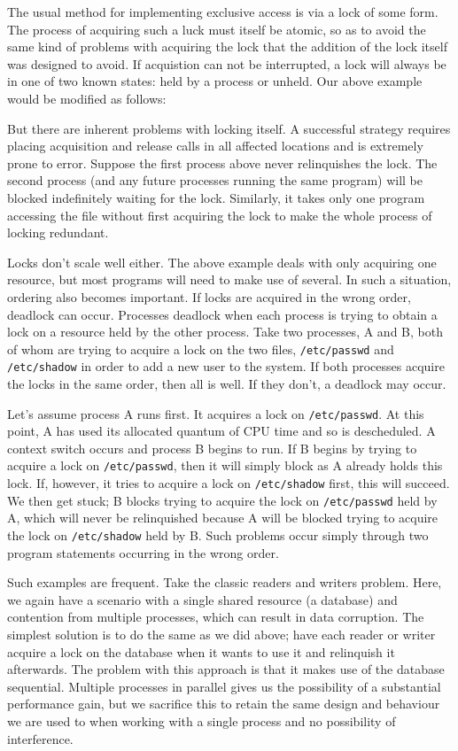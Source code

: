 The usual method for implementing exclusive access is via a lock of
some form.  The process of acquiring such a luck must itself be
atomic, so as to avoid the same kind of problems with acquiring the
lock that the addition of the lock itself was designed to avoid.  If
acquistion can not be interrupted, a lock will always be in one of two
known states: held by a process or unheld.  Our above example would be
modified as follows:


But there are inherent problems with locking itself.  A successful
strategy requires placing acquisition and release calls in all
affected locations and is extremely prone to error.  Suppose the first
process above never relinquishes the lock.  The second process (and
any future processes running the same program) will be blocked
indefinitely waiting for the lock.  Similarly, it takes only one
program accessing the file without first acquiring the lock to make
the whole process of locking redundant.

Locks don't scale well either.  The above example deals with only
acquiring one resource, but most programs will need to make use of
several.  In such a situation, ordering also becomes important.  If
locks are acquired in the wrong order, deadlock can occur.  Processes
deadlock when each process is trying to obtain a lock on a resource
held by the other process.  Take two processes, A and B, both of whom
are trying to acquire a lock on the two files, \texttt{/etc/passwd}
and \texttt{/etc/shadow} in order to add a new user to the system.  If
both processes acquire the locks in the same order, then all is well.
If they don't, a deadlock may occur.

Let's assume process A runs first.  It acquires a lock on
\texttt{/etc/passwd}.  At this point, A has used its allocated quantum
of CPU time and so is descheduled.  A context switch occurs and
process B begins to run.  If B begins by trying to acquire a lock on
\texttt{/etc/passwd}, then it will simply block as A already holds
this lock.  If, however, it tries to acquire a lock on
\texttt{/etc/shadow} first, this will succeed.  We then get stuck; B
blocks trying to acquire the lock on \texttt{/etc/passwd} held by A,
which will never be relinquished because A will be blocked trying to
acquire the lock on \texttt{/etc/shadow} held by B.  Such problems
occur simply through two program statements occurring in the wrong
order.

Such examples are frequent.  Take the classic readers and writers
problem.  Here, we again have a scenario with a single shared resource
(a database) and contention from multiple processes, which can result
in data corruption.  The simplest solution is to do the same as we did
above; have each reader or writer acquire a lock on the database when
it wants to use it and relinquish it afterwards.  The problem with
this approach is that it makes use of the database sequential.
Multiple processes in parallel gives us the possibility of a
substantial performance gain, but we sacrifice this to retain the same
design and behaviour we are used to when working with a single process
and no possibility of interference.

